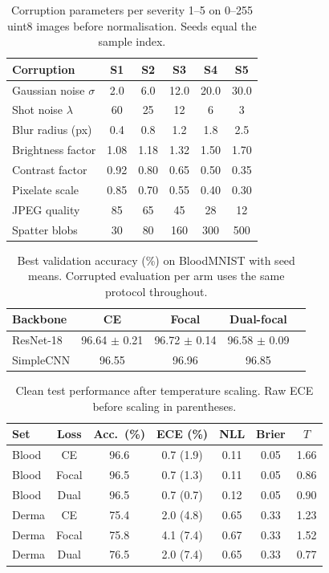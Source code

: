 \documentclass[a4paper,11pt,en,citestyle=authoryear,bibstyle=authoryear]{elegantpaper}
\begin{document}
\begin{table}[H]
  \centering
  \caption{Corruption parameters per severity 1--5 on 0--255 uint8 images before normalisation. Seeds equal the sample index.}
  \label{tab:corr}
  \begin{tabular}{lccccc}
    \toprule
    Corruption & S1 & S2 & S3 & S4 & S5 \\
    \midrule
    Gaussian noise $\sigma$ & 2.0 & 6.0 & 12.0 & 20.0 & 30.0 \\
    Shot noise $\lambda$ & 60 & 25 & 12 & 6 & 3 \\
    Blur radius (px) & 0.4 & 0.8 & 1.2 & 1.8 & 2.5 \\
    Brightness factor & 1.08 & 1.18 & 1.32 & 1.50 & 1.70 \\
    Contrast factor & 0.92 & 0.80 & 0.65 & 0.50 & 0.35 \\
    Pixelate scale & 0.85 & 0.70 & 0.55 & 0.40 & 0.30 \\
    JPEG quality & 85 & 65 & 45 & 28 & 12 \\
    Spatter blobs & 30 & 80 & 160 & 300 & 500 \\
    \bottomrule
  \end{tabular}
\end{table}

\begin{table}[H]
  \centering
  \caption{Best validation accuracy (\%) on BloodMNIST with seed means. Corrupted evaluation per arm uses the same protocol throughout.}
  \label{tab:val}
  \begin{tabular}{lcccc}
    \toprule
    Backbone & CE & Focal & Dual-focal \\
    \midrule
    ResNet-18 & 96.64 $\pm$ 0.21 & 96.72 $\pm$ 0.14 & 96.58 $\pm$ 0.09 \\
    SimpleCNN & 96.55 & 96.96 & 96.85 \\
    \bottomrule
  \end{tabular}
\end{table}

\begin{table}[H]
  \centering
  \caption{Clean test performance after temperature scaling. Raw ECE before scaling in parentheses.}
  \label{tab:clean}
  \begin{tabular}{lcccccc}
    \toprule
    Set & Loss & Acc.\ (\%) & ECE (\%) & NLL & Brier & $T$ \\
    \midrule
    Blood & CE & 96.6 & 0.7 (1.9) & 0.11 & 0.05 & 1.66 \\
    Blood & Focal & 96.5 & 0.7 (1.3) & 0.11 & 0.05 & 0.86 \\
    Blood & Dual & 96.5 & 0.7 (0.7) & 0.12 & 0.05 & 0.90 \\
    Derma & CE & 75.4 & 2.0 (4.8) & 0.65 & 0.33 & 1.23 \\
    Derma & Focal & 75.8 & 4.1 (7.4) & 0.67 & 0.33 & 1.52 \\
    Derma & Dual & 76.5 & 2.0 (7.4) & 0.65 & 0.33 & 0.77 \\
    \bottomrule
  \end{tabular}
\end{table}
\end{document}

